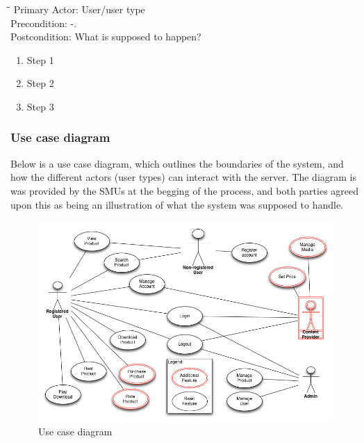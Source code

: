 \begin{tabbing}
\hspace{5mm}\=\hspace{26mm}\=\kill
\>Primary Actor:\> User/user type\\
\>Precondition:\> -.\\
\>Postcondition:\> What is supposed to happen?
\end{tabbing}
\begin{enumerate}
	\item Step 1
	\item Step 2
	\item Step 3
\end{enumerate}
\vspace{3mm}

\subsubsection{Use case diagram}
Below is a use case diagram, which outlines the boundaries of the system, and how the different actors (user types) can interact with the server.
The diagram is was provided by the SMUs at the begging of the process, and both parties agreed upon this as being an illustration of what the system was supposed to handle.
\begin{figure}[ht!]
\centering
\includegraphics[width=160mm]{texts/Client/UseCase.png}
\caption{Use case diagram}
\label{useCaseImg}
\end{figure}

\newpage